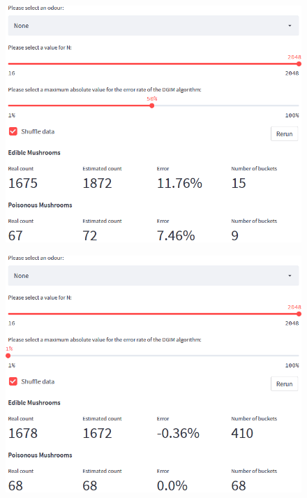 \begin{frame}{}
	\begin{figure}
		\includegraphics[height=.75\linewidth]{images/big_n.png}
	\end{figure}
\end{frame}


\begin{frame}{}
	\begin{figure}
		\includegraphics[height=.75\linewidth]{images/small_e.png}
	\end{figure}
\end{frame}